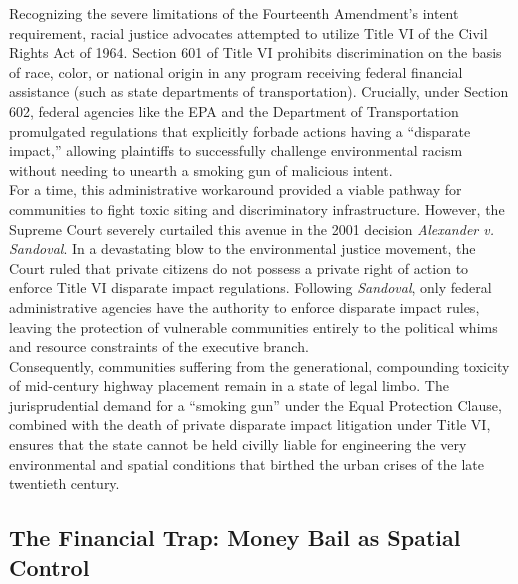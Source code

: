 \documentclass[
]{article}
\begin{document}
Recognizing the severe limitations of the Fourteenth Amendment's intent
requirement, racial justice advocates attempted to utilize Title VI of
the Civil Rights Act of 1964. Section 601 of Title VI prohibits
discrimination on the basis of race, color, or national origin in any
program receiving federal financial assistance (such as state
departments of transportation). Crucially, under Section 602, federal
agencies like the EPA and the Department of Transportation promulgated
regulations that explicitly forbade actions having a ``disparate
impact,'' allowing plaintiffs to successfully challenge environmental
racism without needing to unearth a smoking gun of malicious intent.\\
For a time, this administrative workaround provided a viable pathway for
communities to fight toxic siting and discriminatory infrastructure.
However, the Supreme Court severely curtailed this avenue in the 2001
decision \emph{Alexander v. Sandoval}. In a devastating blow to the
environmental justice movement, the Court ruled that private citizens do
not possess a private right of action to enforce Title VI disparate
impact regulations. Following \emph{Sandoval}, only federal
administrative agencies have the authority to enforce disparate impact
rules, leaving the protection of vulnerable communities entirely to the
political whims and resource constraints of the executive branch.\\
Consequently, communities suffering from the generational, compounding
toxicity of mid-century highway placement remain in a state of legal
limbo. The jurisprudential demand for a ``smoking gun'' under the Equal
Protection Clause, combined with the death of private disparate impact
litigation under Title VI, ensures that the state cannot be held civilly
liable for engineering the very environmental and spatial conditions
that birthed the urban crises of the late twentieth century.

\subsection{\texorpdfstring{\textbf{The Financial Trap: Money Bail as
Spatial
Control}}{The Financial Trap: Money Bail as Spatial Control}}\label{the-financial-trap-money-bail-as-spatial-control}
\end{document}
